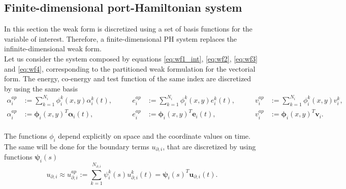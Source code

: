 \documentclass[preprint,12pt]{elsarticle}
\begin{document}
	\subsection{Finite-dimensional port-Hamiltonian system}
	In this section the weak form is discretized using a set of basis functions for the variable of interest. Therefore, a finite-dimensional PH system replaces the infinite-dimensional weak form. \\
	Let us consider the system composed by equations \eqref{eq:wf1_int}, \eqref{eq:wf2}, \eqref{eq:wf3} and \eqref{eq:wf4}, corresponding to the partitioned weak formulation for the vectorial form. The energy, co-energy and test function of the same index are discretized by using the same basis	\begin{equation}
	\begin{aligned}
	\alpha_i^{ap} &:= \sum_{k=1}^{N_i} \phi_i^k(x,y) \alpha_i^k(t),  \\
	\alpha_i^{ap} &:= \bm{\phi}_i(x,y)^T \bm{\alpha}_i(t), \\
	\end{aligned} \qquad 
	\begin{aligned}
	e_i^{ap} &:= \sum_{k=1}^{N_i} \phi_i^k(x,y) e_i^k(t), \\
	e_i^{ap} &:= \bm{\phi}_i(x,y)^T \bm{e}_i(t), \\
	\end{aligned}\qquad 
	\begin{aligned}
	v_i^{ap} &:= \sum_{k=1}^{N_i} \phi_i^k(x,y) v_i^k,  \\
	v_i^{ap} &:= \bm{\phi}_i(x,y)^T \bm{v}_i. \\
	\end{aligned}
	\end{equation}
	
	The functions $\phi_i$ depend explicitly on space and the coordinate values on time. The same will be done for the boundary terms $u_{\partial, i}$, that are discretized by using functions $\bm{\psi}_i(s)$
	\begin{equation}
	u_{\partial, i} \approx u_{\partial, i}^{ap} := \sum_{k=1}^{N_{\partial, i}} \psi^k_i(s) u_{\partial, i}^k(t) = \bm{\psi}_i(s)^T \bm{u}_{\partial, i}(t).
	\end{equation}
	
\end{document}
